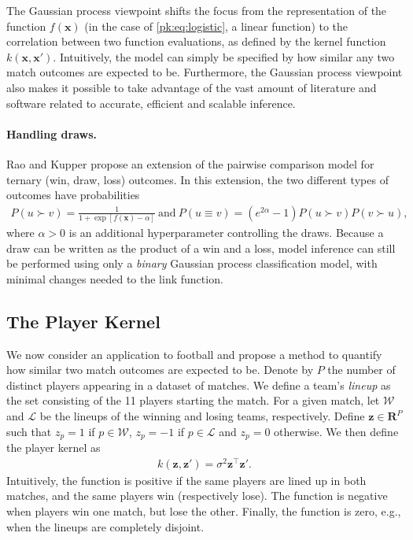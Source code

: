 The Gaussian process viewpoint shifts the focus from the representation of the function $f(\bm{x})$ (in the case of \eqref{pk:eq:logistic}, a linear function) to the correlation between two function evaluations, as defined by the kernel function $k(\bm{x}, \bm{x}')$.
Intuitively, the model can simply be specified by how similar any two match outcomes are expected to be.
Furthermore, the Gaussian process viewpoint also makes it possible to take advantage of the vast amount of literature and software related to accurate, efficient and scalable inference.


\paragraph{Handling draws.}
Rao and Kupper \cite{rao1967ties} propose an extension of the pairwise comparison model for ternary (win, draw, loss) outcomes.
In this extension, the two different types of outcomes have probabilities
\begin{align*}
P(u \succ v) = \frac{1}{1 + \exp[f(\bm{x}) - \alpha]}\ \text{and}\ 
P(u \equiv v) = (e^{2 \alpha} - 1) P(u \succ v) P(v \succ u),
\end{align*}
where $\alpha > 0$ is an additional hyperparameter controlling the draws.
Because a draw can be written as the product of a win and a loss, model inference can still be performed using only a \emph{binary} Gaussian process classification model, with minimal changes needed to the link function.


\subsection{The Player Kernel}

\newcommand{\Wx}{\ensuremath{\mathcal{W}}}
\newcommand{\Lx}{\ensuremath{\mathcal{L}}}
We now consider an application to football and propose a method to quantify how similar two match outcomes are expected to be.
Denote by $P$ the number of distinct players appearing in a dataset of matches.
We define a team's \emph{lineup} as the set consisting of the \num{11} players starting the match.
For a given match, let $\Wx$ and $\Lx$ be the lineups of the winning and losing teams, respectively.
Define $\bm{z} \in \mathbf{R}^P$ such that $z_p = 1$ if $p \in \Wx$, $z_p = -1$ if $p \in \Lx$ and $z_p = 0$ otherwise.
We then define the player kernel as
\begin{align*}
k(\bm{z}, \bm{z}') = \sigma^2 \bm{z}^\top \bm{z}'.
\end{align*}
Intuitively, the function is positive if the same players are lined up in both matches, and the same players win (respectively lose).
The function is negative when players win one match, but lose the other.
Finally, the function is zero, e.g., when the lineups are completely disjoint.


